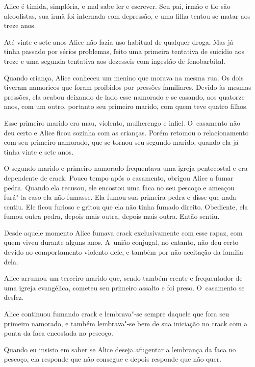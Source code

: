  

Alice é tímida, simplória, e mal sabe ler e escrever. Seu pai, irmão e
tio são alcoolistas, sua irmã foi internada com depressão, e uma filha
tentou se matar aos treze anos.

Até vinte e sete anos Alice não fazia uso habitual de qualquer droga.
Mas já tinha passado por sérios problemas, feito uma primeira tentativa
de suicídio aos treze e uma segunda tentativa aos dezesseis com ingestão
de fenobarbital.

Quando criança, Alice conheceu um menino que morava na mesma rua. Os
dois tiveram namoricos que foram proibidos por pressões familiares.
Devido às mesmas pressões, ela acabou deixando de lado esse namorado e
se casando, aos quatorze anos, com um outro, portanto seu primeiro
marido, com quem teve quatro filhos.

Esse primeiro marido era mau, violento, mulherengo e infiel. O~casamento
não deu certo e Alice ficou sozinha com as crianças. Porém retomou o
relacionamento com seu primeiro namorado, que se tornou seu segundo
marido, quando ela já tinha vinte e sete anos.

O segundo marido e primeiro namorado frequentava uma igreja pentecostal
e era dependente de crack. Pouco tempo após o casamento, obrigou Alice a
fumar pedra. Quando ela recusou, ele encostou uma faca no seu pescoço e
ameaçou furá"-la caso ela não fumasse. Ela fumou sua primeira pedra e
disse que nada sentiu. Ele ficou furioso e gritou que ela não tinha
fumado direito. Obediente, ela fumou outra pedra, depois mais outra,
depois mais outra. Então sentiu.

Desde aquele momento Alice fumava crack exclusivamente com esse rapaz,
com quem viveu durante alguns anos. A~união conjugal, no entanto, não
deu certo devido ao comportamento violento dele, e também por não
aceitação da família dela.

Alice arrumou um terceiro marido que, sendo também crente e frequentador
de uma igreja evangélica, cometeu seu primeiro assalto e foi preso. O~casamento se desfez.

Alice continuou fumando crack e lembrava"-se sempre daquele que fora seu
primeiro namorado, e também lembrava"-se bem de sua iniciação no crack
com a ponta da faca encostada no pescoço.

Quando eu insisto em saber se Alice deseja afugentar a lembrança da faca
no pescoço, ela responde que não consegue e depois responde que não
quer.

